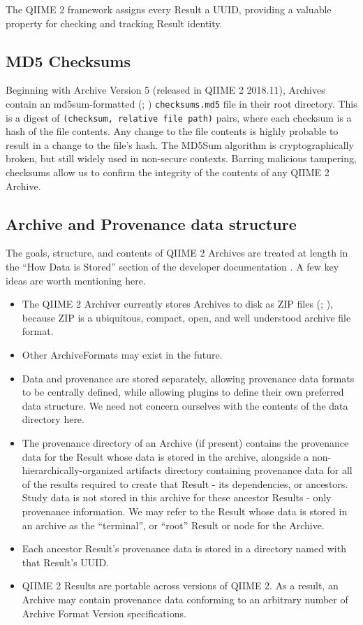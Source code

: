 The QIIME 2 framework assigns every Result a UUID, providing a valuable property
for checking and tracking Result identity. 

\subsection{MD5 Checksums}

Beginning with Archive Version 5 (released in QIIME 2 2018.11), Archives contain
an md5sum-formatted (\cite{rivest_md5_1992}; \cite{ulrich_drepper_md5sum1_2010})
\texttt{checksums.md5} file in their root directory. This is a digest of \texttt{(checksum, relative file path)}
pairs, where each checksum is a hash of the file contents.
Any change to the file contents is highly probable to result in a change to the
file’s hash. The MD5Sum algorithm is cryptographically broken, but still widely
used in non-secure contexts. Barring malicious tampering, checksums allow us to
confirm the integrity of the contents of any QIIME 2 Archive.

\subsection{Archive and Provenance data structure}
The goals, structure, and contents of QIIME 2 Archives are treated at length in
the “How Data is Stored” section of the developer documentation \parencite{qiime_2_development_team_how_2018}.
A few key ideas are worth mentioning here.

\begin{itemize}
    \item The QIIME 2 Archiver currently stores Archives to disk as ZIP files (\cite{noauthor_appnote_nodate}; \cite{iso_isoiec_nodate}), because ZIP is a ubiquitous, compact, open, and well understood archive file format.
    \item Other ArchiveFormats may exist in the future.
    \item Data and provenance are stored separately, allowing provenance data formats to be centrally defined, while allowing plugins to define their own preferred data structure. We need not concern ourselves with the contents of the data directory here.
    \item The provenance directory of an Archive (if present) contains the provenance data for the Result whose data is stored in the archive, alongside a non-hierarchically-organized artifacts directory containing provenance data for all of the results required to create that Result - its dependencies, or ancestors. Study data is not stored in this archive for these ancestor Results - only provenance information. We may refer to the Result whose data is stored in an archive as the “terminal”, or “root” Result or node for the Archive.
    \item Each ancestor Result’s provenance data is stored in a directory named with that Result’s UUID.
    \item QIIME 2 Results are portable across versions of QIIME 2. As a result, an Archive may contain provenance data conforming to an arbitrary number of Archive Format Version specifications.
\end{itemize}

